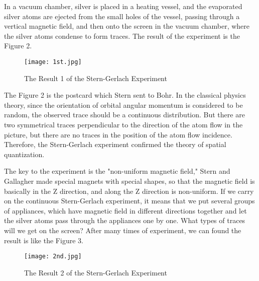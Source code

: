 \documentclass[a4paper]{article}
\begin{document}
In a vacuum chamber, silver is placed in a heating vessel, and the evaporated silver atoms are ejected from the small holes of the vessel, passing through a vertical magnetic field, and then onto the screen in the vacuum chamber, where the silver atoms condense to form traces. The result of the experiment is the Figure 2.

\begin{figure}[htbp!] \label{1st result}
\centering %
    \texttt{[image: 1st.jpg]}
    \caption{The Result 1 of the Stern-Gerlach Experiment}
\end{figure}

The Figure 2 is the postcard which Stern sent to Bohr. In the classical physics theory, since the orientation of orbital angular momentum is considered to be random, the observed trace should be a continuous distribution. But there are two symmetrical traces perpendicular to the direction of the atom flow in the picture, but there are no traces in the position of the atom flow incidence. Therefore, the Stern-Gerlach experiment confirmed the theory of spatial quantization.
\cite{FeynmanR.P.Leighton2005}

The key to the experiment is the "non-uniform magnetic field," Stern and Gallagher made special magnets with special shapes, so that the magnetic field is basically in the Z direction, and along the Z direction is non-uniform. If we carry on the continuous Stern-Gerlach experiment, it means that we put several groups of appliances, which have magnetic field in different directions together and let the silver atoms pass through the appliances one by one. What types of traces will we get on the screen? After many times of experiment, we can found the result is like the Figure 3.

\begin{figure}[htbp!] \label{2nd result}
\centering %
    \texttt{[image: 2nd.jpg]}
    \caption{The Result 2 of the Stern-Gerlach Experiment}
\end{figure}
\end{document}
